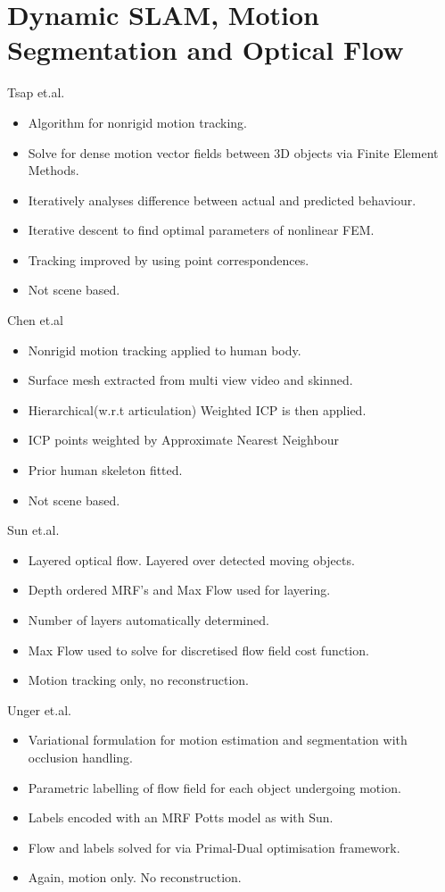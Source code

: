 \section{Dynamic SLAM, Motion Segmentation and Optical Flow}
\label{sec:lit_review_dynamic}
Tsap et.al. \cite{Tsap2000}
\begin{itemize}
	\item Algorithm for nonrigid motion tracking.
	\item Solve for dense motion vector fields between 3D objects via Finite Element Methods. %
	\item Iteratively analyses difference between actual and predicted behaviour.
	\item Iterative descent to find optimal parameters of nonlinear FEM.
	\item Tracking improved by using point correspondences.
	\item Not scene based.
\end{itemize}

Chen et.al \cite{Chen2011}
\begin{itemize}
	\item Nonrigid motion tracking applied to human body.
	\item Surface mesh extracted from multi view video and skinned.
	\item Hierarchical(w.r.t articulation) Weighted ICP is then applied.
	\item ICP points weighted by Approximate Nearest Neighbour %
	\item Prior human skeleton fitted.
	\item Not scene based.
\end{itemize}

Sun et.al. \cite{Sun2012}
\begin{itemize}
	\item Layered optical flow. Layered over detected moving objects.
	\item Depth ordered MRF's and Max Flow used for layering.%
	\item Number of layers automatically determined.
	\item Max Flow used to solve for discretised flow field cost function.
	\item Motion tracking only, no reconstruction.
\end{itemize}

Unger et.al. \cite{Unger2012}
\begin{itemize}
	\item Variational formulation for motion estimation and segmentation with occlusion handling.
	\item Parametric labelling of flow field for each object undergoing motion.
	\item Labels encoded with an MRF Potts model as with Sun. %
	\item Flow and labels solved for via Primal-Dual optimisation framework. %
	\item Again, motion only. No reconstruction.
\end{itemize}

